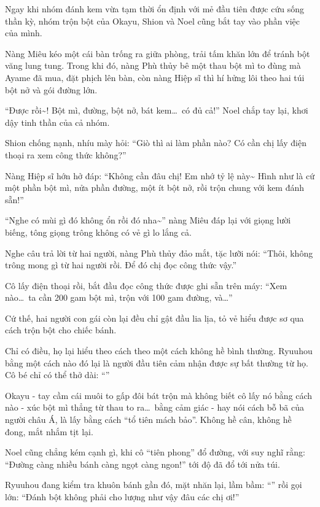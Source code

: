 \documentclass[../main.tex]{subfiles}
\begin{document}
Ngay khi nhóm đánh kem vừa tạm thời ổn định với mẻ đầu tiên được cứu sống thần kỳ, nhóm trộn bột của Okayu, Shion và Noel cũng bắt tay vào phần việc của mình.

Nàng Miêu kéo một cái bàn trống ra giữa phòng, trải tấm khăn lớn để tránh bột văng lung tung. Trong khi đó, nàng Phù thủy bê một thau bột mì to đùng mà Ayame đã mua, đặt phịch lên bàn, còn nàng Hiệp sĩ thì hí hửng lôi theo hai túi bột nở và gói đường lớn.

``Được rồi\~{}! Bột mì, đường, bột nở, bát kem\dots\ có đủ cả!'' Noel chắp tay lại, khơi dậy tinh thần của cả nhóm.

Shion chống nạnh, nhíu mày hỏi: ``Giò thì ai làm phần nào? Có cần chị lấy điện thoại ra xem công thức không?''

Nàng Hiệp sĩ hớn hở đáp: ``Không cần đâu chị! Em nhớ tỷ lệ này\~{} Hình như là cứ một phần bột mì, nửa phần đường, một ít bột nở, rồi trộn chung với kem đánh sẵn!''

``Nghe có mùi gì đó không ổn rồi đó nha\~{}'' nàng Miêu đáp lại với giọng lười biếng, tông giọng trông không có vẻ gì lo lắng cả.

Nghe câu trả lời từ hai người, nàng Phù thủy đảo mắt, tặc lưỡi nói: ``Thôi, không trông mong gì từ hai người rồi. Để đó chị đọc công thức vậy.''

Cô lấy điện thoại rồi, bắt đầu đọc công thức được ghi sẵn trên máy: ``Xem nào\dots\ ta cần 200 gam bột mì, trộn với 100 gam đường, và\dots''

Cứ thế, hai người con gái còn lại đều chỉ gật đầu lia lịa, tỏ vẻ hiểu được sơ qua cách trộn bột cho chiếc bánh.

Chỉ có điều, họ lại hiểu theo cách theo một cách không hề bình thường. Ryuuhou bằng một cách nào đó lại là người đầu tiên cảm nhận được sự bất thường từ họ. Cô bé chỉ có thể thở dài: ``''

\ct

Okayu - tay cầm cái muôi to gấp đôi bát trộn mà không biết cô lấy nó bằng cách nào - xúc bột mì thẳng từ thau to ra\dots\ bằng cảm giác - hay nói cách bỗ bã của người châu Á, là lấy bằng cách ``tổ tiên mách bảo''. Không hề cân, không hề đong, mắt nhắm tịt lại.

Noel cũng chẳng kém cạnh gì, khi cô ``tiên phong'' đổ đường, với suy nghĩ rằng: ``Đường càng nhiều bánh càng ngọt càng ngon!'' tới độ đã đổ tới nửa túi.

Ryuuhou đang kiểm tra khuôn bánh gần đó, mặt nhăn lại, lầm bầm: ``'' rồi gọi lớn: ``Đánh bột không phải cho lượng như vậy đâu các chị ơi!''
\end{document}
